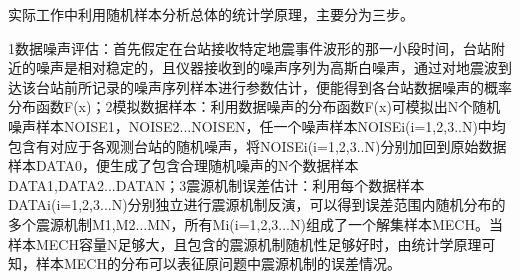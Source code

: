 实际工作中利用随机样本分析总体的统计学原理，主要分为三步。

1数据噪声评估：首先假定在台站接收特定地震事件波形的那一小段时间，台站附近的噪声是相对稳定的，且仪器接收到的噪声序列为高斯白噪声，通过对地震波到达该台站前所记录的噪声序列样本进行参数估计，便能得到各台站数据噪声的概率分布函数F(x)；2模拟数据样本：利用数据噪声的分布函数F(x)可模拟出N个随机噪声样本NOISE1，NOISE2...NOISEN，任一个噪声样本NOISEi(i=1,2,3..N)中均包含有对应于各观测台站的随机噪声，将NOISEi(i=1,2,3..N)分别加回到原始数据样本DATA0，便生成了包含合理随机噪声的N个数据样本DATA1,DATA2...DATAN；3震源机制误差估计：利用每个数据样本DATAi(i=1,2,3...N)分别独立进行震源机制反演，可以得到误差范围内随机分布的多个震源机制M1,M2...MN，所有Mi(i=1,2,3...N)组成了一个解集样本MECH。当样本MECH容量N足够大，且包含的震源机制随机性足够好时，由统计学原理可知，样本MECH的分布可以表征原问题中震源机制的误差情况。

